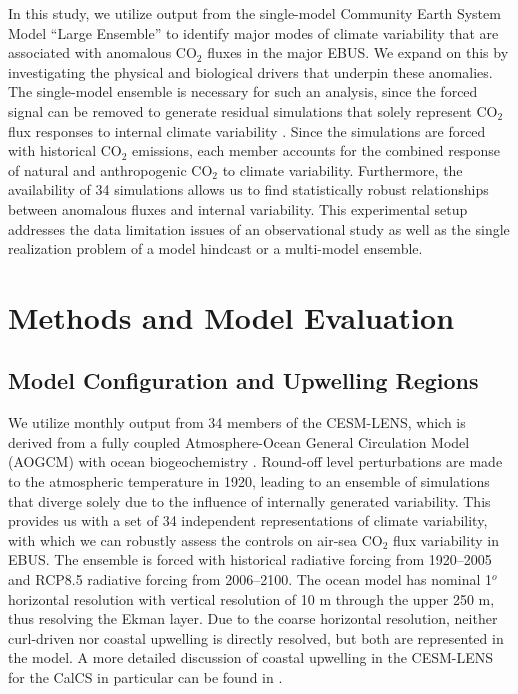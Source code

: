 \documentclass[hvmath, online,bgd]{copernicus_discussions}
\begin{document}
In this study, we utilize output from the single-model Community Earth System Model ``Large Ensemble'' \citep[CESM-LENS;][]{Kay:2015,Lovenduski:2016} to identify major modes of climate variability that are associated with anomalous CO$_{2}$ fluxes in the major EBUS. We expand on this by investigating the physical and biological drivers that underpin these anomalies. The single-model ensemble is necessary for such an analysis, since the forced signal can be removed to generate residual simulations that solely represent CO$_{2}$ flux responses to internal climate variability \citep{Thompson:2015}. Since the simulations are forced with historical CO$_{2}$ emissions, each member accounts for the combined response of natural and anthropogenic CO$_{2}$ to climate variability. Furthermore, the availability of 34 simulations allows us to find statistically robust relationships between anomalous fluxes and internal variability. This experimental setup addresses the data limitation issues of an observational study as well as the single realization problem of a model hindcast or a multi-model ensemble.


\section{Methods and Model Evaluation}

\subsection{Model Configuration and Upwelling Regions}
We utilize monthly output from 34 members of the CESM-LENS, which is derived from a fully coupled Atmosphere-Ocean General Circulation Model (AOGCM) with ocean biogeochemistry \citep{Kay:2015,Lovenduski:2016}. Round-off level perturbations are made to the atmospheric temperature in 1920, leading to an ensemble of simulations that diverge solely due to the influence of internally generated variability. This provides us with a set of 34 independent representations of climate variability, with which we can robustly assess the controls on air-sea CO$_{2}$ flux variability in EBUS. The ensemble is forced with historical radiative forcing from 1920--2005 and RCP8.5 radiative forcing from 2006--2100. The ocean model has nominal 1$^{o}$ horizontal resolution with vertical resolution of 10 m through the upper 250 m, thus resolving the Ekman layer. Due to the coarse horizontal resolution, neither curl-driven nor coastal upwelling is directly resolved, but both are represented in the model. A more detailed discussion of coastal upwelling in the CESM-LENS for the CalCS in particular can be found in \cite{Brady:2017}.
\end{document}
